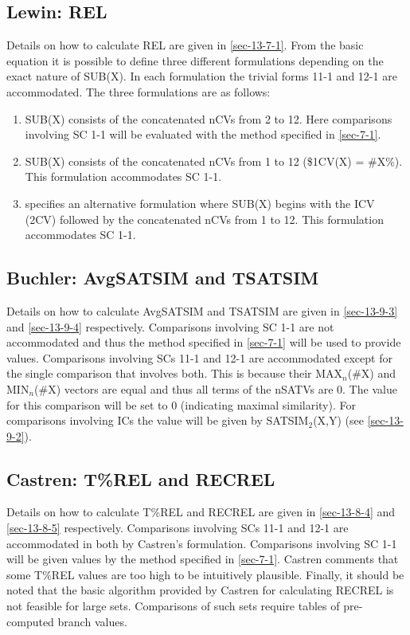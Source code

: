 \documentclass{article}
\begin{document}
\subsection{Lewin: REL}
\label{sec-7-3}

Details on how to calculate REL are given in \ref{sec-13-7-1}. From the basic
equation it is possible to define three different formulations
depending on the exact nature of SUB(X). In each formulation the
trivial forms 11-1 and 12-1 are accommodated. The three formulations
are as follows:
\begin{enumerate}
\item SUB(X) consists of the concatenated nCVs from 2 to 12. Here
   comparisons involving SC 1-1 will be evaluated with the method
   specified in \ref{sec-7-1}.
\item SUB(X) consists of the concatenated nCVs from 1 to 12 (\$1CV(X) =
   \#X\%). This formulation accommodates SC 1-1.
\item \citet{Martorell2013} specifies an alternative formulation where
   SUB(X) begins with the ICV (2CV) followed by the concatenated nCVs
   from 1 to 12. This formulation accommodates SC 1-1.
\end{enumerate}
\subsection{Buchler: AvgSATSIM and TSATSIM}
\label{sec-7-4}

Details on how to calculate AvgSATSIM and TSATSIM are given in
\ref{sec-13-9-3} and \ref{sec-13-9-4} respectively. Comparisons involving SC 1-1 are
not accommodated and thus the method specified in \ref{sec-7-1} will
be used to provide values. Comparisons involving SCs 11-1 and 12-1 are
accommodated except for the single comparison that involves both. This
is because their MAX$_{n}$(\#X) and MIN$_{n}$(\#X) vectors are equal and
thus all terms of the nSATVs are 0. The value for this comparison will
be set to 0 (indicating maximal similarity). For comparisons involving
ICs the value will be given by SATSIM$_{2}$(X,Y) (see \ref{sec-13-9-2}).
\subsection{Castren: T\%REL and RECREL}
\label{sec-7-5}

Details on how to calculate T\%REL and RECREL are given in \ref{sec-13-8-4} and
\ref{sec-13-8-5} respectively. Comparisons involving SCs 11-1 and 12-1 are
accommodated in both by Castren's formulation. Comparisons involving
SC 1-1 will be given values by the method specified in \ref{sec-7-1}. Castren comments that some T\%REL values are too high to be
intuitively plausible. Finally, it should be noted that the basic
algorithm provided by Castren for calculating RECREL is not feasible
for large sets. Comparisons of such sets require tables of pre-computed
branch values.
\end{document}
